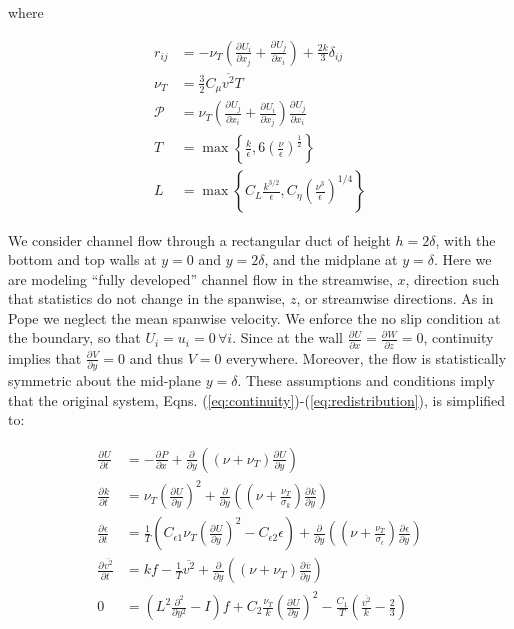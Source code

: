 \documentclass[a4paper,11pt]{article}
\newcommand{\pderiv}[3][]{%
  \ensuremath{\frac{\partial^{#1} {#2}}{\partial {#3}^{#1}}}}
\newcommand{\noi}{\noindent}
\newcommand{\ep}{\epsilon}
\begin{document}
\noi where 

\begin{align*}
r_{ij} &= -\nu_T\left(\pderiv{U_i}{x_j} + \pderiv{U_j}{x_i}\right) +
\frac{2k}{3}\delta_{ij}\\
\nu_T &= \frac{3}{2}C_\mu \overline{v^2} T \\
\mathcal{P} &= \nu_T\left( \pderiv{U_j}{x_i} + \pderiv{U_i}{x_j}\right)\pderiv{U_j}{x_i} \\
T &= \max \left\{ \frac{k}{\ep} , 6 \left( \frac{\nu}{\ep} \right)^{\frac{1}{2}}
\right\} \\
L &= \max \left\{ C_L \frac{k^{3/2}}{\ep}, C_\eta \left( \frac{\nu^3}{\ep}
\right)^{1/4} \right\}
\end{align*}

We consider channel flow through a rectangular duct of height $h= 2\delta$, with
the bottom and top walls at $y=0$ and $y=2\delta$, and the midplane at
$y=\delta$.
Here we are modeling ``fully developed'' channel flow in the streamwise, $x$,
direction such that statistics do not change in the spanwise, $z$, or
streamwise directions. As in Pope \cite{pope} we neglect the mean spanwise
velocity. 
We enforce the no slip condition at the boundary, so that
$U_i=u_i=0 \, \forall i$. Since at the wall
$\pderiv{U}{x}=\pderiv{W}{z} = 0$, continuity implies that
$\pderiv{V}{y}=0$ and thus $V=0$ everywhere. Moreover, the flow is statistically
symmetric about the mid-plane $y = \delta$. These assumptions and conditions
imply that the original system, Eqns.
(\ref{eq:continuity})-(\ref{eq:redistribution}), is simplified to: 

\begin{align}
	\label{eq:ssv2f1}
        \pderiv{U}{t} &= -\pderiv{P}{x} +
\pderiv{}{y}\left((\nu+\nu_T)\pderiv{U}{y}\right) \\
        \pderiv{k}{t} &= \nu_T\left(\pderiv{U}{y}\right)^2 + 
\pderiv{}{y}\left((\nu+\frac{\nu_T}{\sigma_k})\pderiv{k}{y}\right) \\
        \pderiv{\ep}{t} &= \frac{1}{T}\left(C_{\ep
1}\nu_T\left(\pderiv{U}{y}\right)^2 - C_{\ep 2}\ep\right) + 
\pderiv{}{y}\left((\nu+\frac{\nu_T}{\sigma_\ep})\pderiv{\ep}{y}\right) \\
        \pderiv{\overline{v^2}}{t} &= kf - \frac{1}{T}\overline{v^2} +
\pderiv{}{y}\left((\nu+\nu_T)\pderiv{\overline{v}}{y}\right) \\
        0 &= \left( L^2\frac{\partial^2}{\partial y^2} - I\right)f +
C_2\frac{\nu_T}{k}\left(\pderiv{U}{y}\right)^2 -
\frac{C_1}{T}\left(\frac{\overline{v^2}}{k}-\frac{2}{3}\right)
	\label{eq:ssv2f5}
\end{align}
\end{document}

